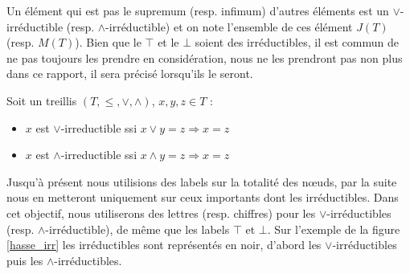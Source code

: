 Un élément qui est pas le supremum (resp. infimum) d'autres éléments est un $\vee$-irréductible (resp. $\wedge$-irréductible) et on note l'ensemble de ces élément $J(T)$ (resp. $M(T)$). Bien que le $\top$ et le $\bot$ soient des irréductibles, il est commun de ne pas toujours les prendre en considération, nous ne les prendront pas non plus dans ce rapport, il sera précisé lorsqu'ils le seront.

\begin{definition}
Soit un treillis $(T, \leq, \vee, \wedge)$, $x, y, z \in T$ :
\begin{itemize}
	\item $x$ est $\vee$-irreductible ssi $x \vee y = z \Rightarrow x = z$
	\item $x$ est $\wedge$-irreductible ssi $x \wedge y = z \Rightarrow x = z$
\end{itemize}
\end{definition}

Jusqu'à présent nous utilisions des labels sur la totalité des n\oe uds, par la suite nous en metteront uniquement sur ceux importants dont les irréductibles. Dans cet objectif, nous utiliserons des lettres (resp. chiffres) pour les $\vee$-irréductibles (resp. $\wedge$-irréductible), de même que les labels $\top$ et $\bot$. Sur l'exemple de la figure \ref{hasse_irr} les irréductibles sont représentés en noir, d'abord les $\vee$-irréductibles puis les $\wedge$-irréductibles.

